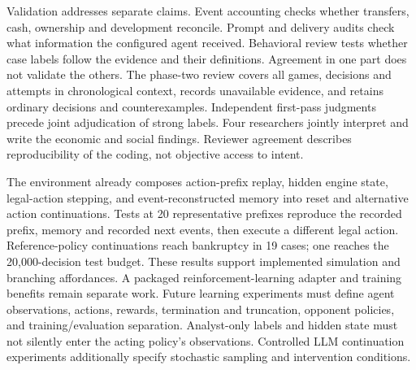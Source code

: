 Validation addresses separate claims. Event accounting checks whether transfers,
cash, ownership and development reconcile. Prompt and delivery audits check what
information the configured agent received. Behavioral review tests whether case
labels follow the evidence and their definitions. Agreement in one part does
not validate the others. The phase-two review covers all games, decisions and
attempts in chronological context, records unavailable evidence, and retains
ordinary decisions and counterexamples. Independent first-pass judgments precede
joint adjudication of strong labels. Four researchers jointly interpret and write
the economic and social findings. Reviewer agreement describes reproducibility
of the coding, not objective access to intent.

The environment already composes action-prefix replay, hidden engine state,
legal-action stepping, and event-reconstructed memory into reset and alternative
action continuations. Tests at 20 representative prefixes reproduce the recorded
prefix, memory and recorded next events, then execute a different legal action.
Reference-policy continuations reach bankruptcy in 19 cases; one reaches the
20,000-decision test budget. These results support implemented simulation and
branching affordances. A packaged reinforcement-learning adapter and training
benefits remain separate work. Future learning experiments must define agent
observations, actions, rewards, termination and truncation, opponent policies,
and training/evaluation separation. Analyst-only labels and hidden state must
not silently enter the acting policy's observations. Controlled LLM continuation
experiments additionally specify stochastic sampling and intervention conditions.
